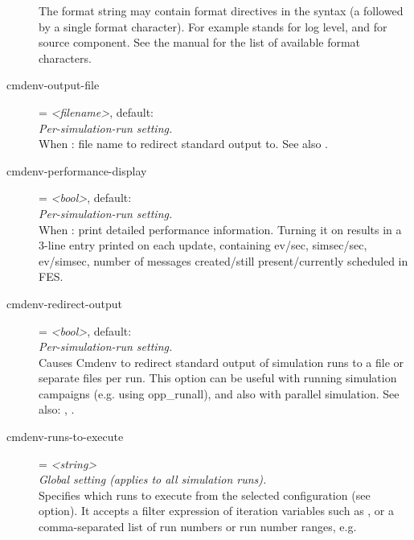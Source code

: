 \begin{description}
    The format string may contain format directives in the syntax  (a
    \ttt{\%} followed by a single format character).  For example 
    stands for log level, and  for source component. See the manual
    for the list of available format characters.
\item[cmdenv-output-file] = \textit{<filename>}, default: \\
    \textit{Per-simulation-run setting.}\\
    When
    :
    file name to redirect standard output to. See also
    .
\item[cmdenv-performance-display] = \textit{<bool>}, default: \\
    \textit{Per-simulation-run setting.}\\
    When :
    print detailed performance information. Turning it on results in a 3-line
    entry printed on each update, containing ev/sec, simsec/sec, ev/simsec,
    number of messages created/still present/currently scheduled in FES.
\item[cmdenv-redirect-output] = \textit{<bool>}, default: \\
    \textit{Per-simulation-run setting.}\\
    Causes Cmdenv to redirect standard output of simulation runs to a file or
    separate files per run. This option can be useful with running simulation
    campaigns (e.g. using opp\_runall), and also with parallel simulation. See
    also: ,
    .
\item[cmdenv-runs-to-execute] = \textit{<string>}\\
    \textit{Global setting (applies to all simulation runs).}\\
    Specifies which runs to execute from the selected configuration (see
     option). It accepts a
    filter expression of iteration variables such as , or
    a comma-separated list of run numbers or run number ranges, e.g.

\end{description}
